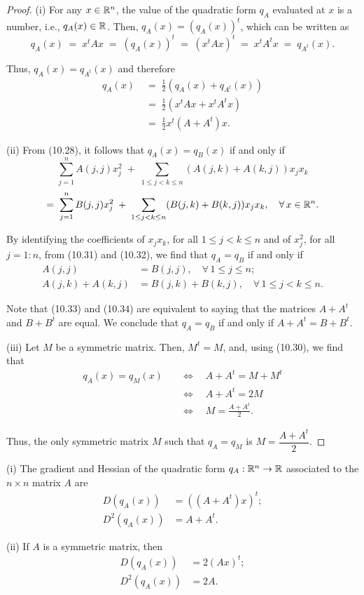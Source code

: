 \begin{proof}
(i) For any $x \in \mathbb{R}^n$, the value of the quadratic form $q_A$ evaluated at $x$ is a
number, i.e., $q_A(x) \in \mathbb{R}$. Then, $q_A(x) = (q_A(x))^t$, which can be written as
\[
q_A(x) \;=\; x^tAx \;=\; (q_A(x))^t \;=\; (x^tAx)^t \;=\; x^tA^tx \;=\; q_{A^t}(x).
\]

Thus, $q_A(x) = q_{A^t}(x)$ and therefore
\begin{align*}
q_A(x) \;&=\; \frac12\left(q_A(x)+q_{A^t}(x)\right) \\
&=\; \frac12\left(x^tAx+x^tA^tx\right) \\
&=\; \frac12 x^t\left(A+A^t\right)x.
\end{align*}

(ii) From (10.28), it follows that $q_A(x) = q_B(x)$ if and only if
\begin{equation}
\sum_{j=1}^n A(j,j)x_j^2 \;+\; \sum_{1\le j<k\le n} (A(j,k)+A(k,j))x_jx_k
\end{equation}
\begin{equation}
=\; \sum_{j=1}^n B(j,j)x_j^2 \;+\; \sum_{1\le j<k\le n} (B(j,k)+B(k,j))x_jx_k, \quad \forall\, x \in \mathbb{R}^n.
\end{equation}

By identifying the coefficients of $x_jx_k$, for all $1 \le j < k \le n$ and of
$x_j^2$, for all $j = 1:n$, from (10.31) and (10.32), we find that $q_A = q_B$ if and
only if
\begin{align}
A(j,j) &= B(j,j), \quad \forall\, 1 \le j \le n; \\
A(j,k)+A(k,j) &= B(j,k)+B(k,j), \quad \forall\, 1 \le j < k \le n.
\end{align}

Note that (10.33) and (10.34) are equivalent to saying that the matrices $A+A^t$ and
$B+B^t$ are equal. We conclude that $q_A = q_B$ if and only if $A+A^t = B+B^t$.

(iii) Let $M$ be a symmetric matrix. Then, $M^t = M$, and, using (10.30), we find
that
\begin{align*}
q_A(x) = q_M(x) \quad &\iff \quad A+A^t = M+M^t \\
&\iff \quad A+A^t = 2M \\
&\iff \quad M = \frac{A+A^t}{2}.
\end{align*}

Thus, the only symmetric matrix $M$ such that $q_A = q_M$ is $M = \dfrac{A+A^t}{2}$.
\end{proof}

\begin{theorem}
(i) The gradient and Hessian of the quadratic form $q_A : \mathbb{R}^n \to \mathbb{R}$ associated to
the $n \times n$ matrix $A$ are
\begin{align}
D(q_A(x)) &= \left((A+A^t)x\right)^t; \\
D^2(q_A(x)) &= A+A^t.
\end{align}

(ii) If $A$ is a symmetric matrix, then
\begin{align}
D(q_A(x)) &= 2(Ax)^t; \\
D^2(q_A(x)) &= 2A.
\end{align}
\end{theorem}

